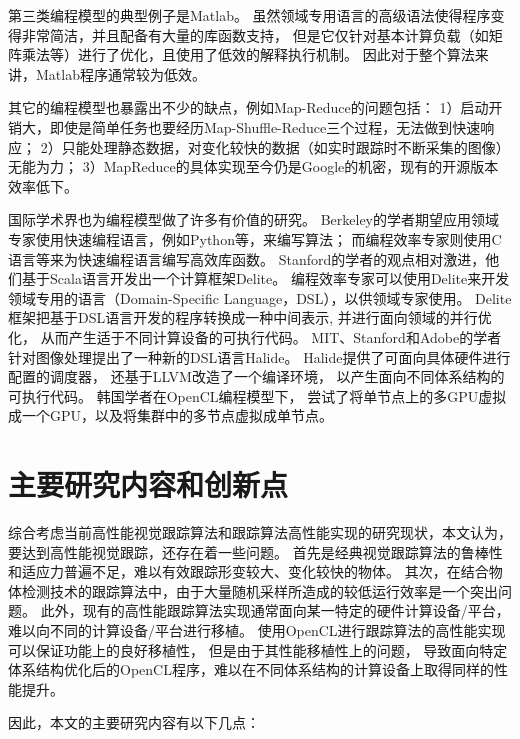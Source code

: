 第三类编程模型的典型例子是Matlab。
虽然领域专用语言的高级语法使得程序变得非常简洁，并且配备有大量的库函数支持，
但是它仅针对基本计算负载（如矩阵乘法等）进行了优化，且使用了低效的解释执行机制。
因此对于整个算法来讲，Matlab程序通常较为低效。

其它的编程模型也暴露出不少的缺点，例如Map-Reduce的问题包括：
1）启动开销大，即使是简单任务也要经历Map-Shuffle-Reduce三个过程，无法做到快速响应；
2）只能处理静态数据，对变化较快的数据（如实时跟踪时不断采集的图像）无能为力；
3）MapReduce的具体实现至今仍是Google的机密，现有的开源版本效率低下。

国际学术界也为编程模型做了许多有价值的研究。
Berkeley的学者期望应用领域专家使用快速编程语言，例如Python等，来编写算法；
而编程效率专家则使用C语言等来为快速编程语言编写高效库函数。
Stanford的学者的观点相对激进，他们基于Scala语言开发出一个计算框架Delite。
编程效率专家可以使用Delite来开发领域专用的语言（Domain-Specific Language，DSL），以供领域专家使用。
Delite框架把基于DSL语言开发的程序转换成一种中间表示, 并进行面向领域的并行优化，
从而产生适于不同计算设备的可执行代码。
MIT、Stanford和Adobe的学者针对图像处理提出了一种新的DSL语言\pozhehao Halide。
Halide提供了可面向具体硬件进行配置的调度器，
还基于LLVM改造了一个编译环境，
以产生面向不同体系结构的可执行代码。
韩国学者在OpenCL编程模型下，
尝试了将单节点上的多GPU虚拟成一个GPU，以及将集群中的多节点虚拟成单节点。


\section{主要研究内容和创新点}
综合考虑当前高性能视觉跟踪算法和跟踪算法高性能实现的研究现状，本文认为，
要达到高性能视觉跟踪，还存在着一些问题。
首先是经典视觉跟踪算法的鲁棒性和适应力普遍不足，难以有效跟踪形变较大、变化较快的物体。
其次，在结合物体检测技术的跟踪算法中，由于大量随机采样所造成的较低运行效率是一个突出问题。
此外，现有的高性能跟踪算法实现通常面向某一特定的硬件计算设备/平台，难以向不同的计算设备/平台进行移植。
使用OpenCL进行跟踪算法的高性能实现可以保证功能上的良好移植性，
但是由于其性能移植性上的问题，
导致面向特定体系结构优化后的OpenCL程序，难以在不同体系结构的计算设备上取得同样的性能提升。

因此，本文的主要研究内容有以下几点：

